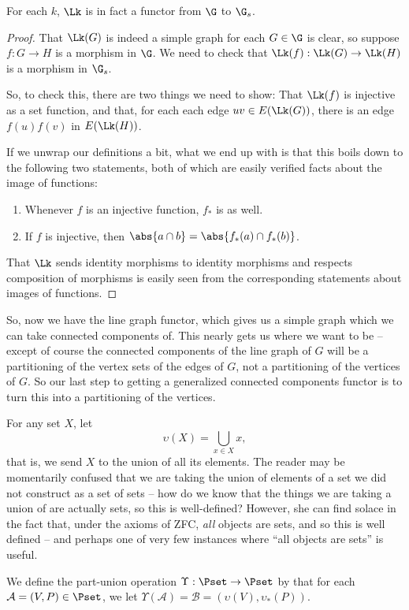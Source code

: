 \documentclass[a4paper,reqno,oneside]{article} %
\begin{document}
\begin{lemma}\label{lem:line_graph_is_functor}
    For each $k$, $\Lk$ is in fact a functor from $\G$ to $\G_s$.
\end{lemma}
\begin{proof}
    That $\Lk(G)$ is indeed a simple graph for each $G \in \G$ is clear, so suppose $f: G \to H$ is a morphism in $\G$. We need to check that $\Lk(f): \Lk(G) \to \Lk(H)$ is a morphism in $\G_s$.

    So, to check this, there are two things we need to show: That $\Lk(f)$ is injective as a set function, and that, for each each edge $uv \in E(\Lk(G))$, there is an edge $f(u)f(v)$ in $E(\Lk(H))$. 
    
    If we unwrap our definitions a bit, what we end up with is that this boils down to the following two statements, both of which are easily verified facts about the image of functions:
    \begin{enumerate}
        \item Whenever $f$ is an injective function, $f_*$ is as well.
        \item If $f$ is injective, then $\abs{a \cap b} = \abs{f_*(a) \cap f_*(b)}$.
    \end{enumerate}

    That $\Lk$ sends identity morphisms to identity morphisms and respects composition of morphisms is easily seen from the corresponding statements about images of functions.
\end{proof}

So, now we have the line graph functor, which gives us a simple graph which we can take connected components of. This nearly gets us where we want to be -- except of course the connected components of the line graph of $G$ will be a partitioning of the vertex sets of the edges of $G$, not a partitioning of the vertices of $G$. So our last step to getting a generalized connected components functor is to turn this into a partitioning of the vertices.

\begin{definition}
    For any set $X$, let
    $$\upsilon(X) = \bigcup_{x \in X} x,$$
    that is, we send $X$ to the union of all its elements. The reader may be momentarily confused that we are taking the union of elements of a set we did not construct as a set of sets -- how do we know that the things we are taking a union of are actually sets, so this is well-defined? However, she can find solace in the fact that, under the axioms of ZFC, \emph{all} objects are sets, and so this is well defined -- and perhaps one of very few instances where ``all objects are sets'' is useful.
    
    We define the part-union operation $\Upsilon: \Pset \to \Pset$ by that for each $\mathcal{A} = (V, P) \in \Pset$, we let $\Upsilon(\mathcal{A}) = \mathcal{B} = (\upsilon(V),\upsilon_*(P))$.
\end{definition}
\end{document}
